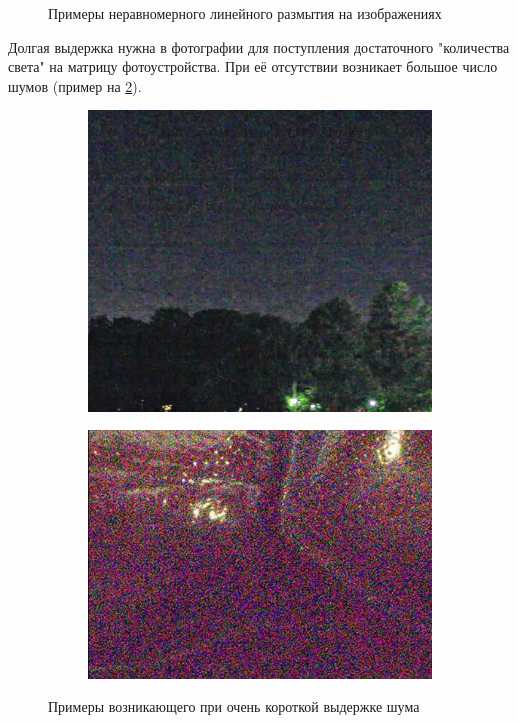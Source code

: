 \begin{figure}[h!]
\begin{subfigure}[b]{0.5\linewidth}
  \end{subfigure}
  \caption{Примеры неравномерного линейного размытия на изображениях}
  \label{fig:lblur}
\end{figure}

Долгая выдержка нужна в фотографии для поступления достаточного "количества света" на матрицу фотоустройства. При её отсутствии возникает большое число шумов (пример на \ref{fig:low_exposure}).

\begin{figure}[h!]
  \centering
  \begin{subfigure}[b]{0.4\linewidth}
    \includegraphics[width=\linewidth]{pics/linear_motion_blur/low_exposure.jpg}
  \end{subfigure}
  \begin{subfigure}[b]{0.4\linewidth}
    \includegraphics[width=\linewidth]{pics/linear_motion_blur/other_low_exp.PNG}
  \end{subfigure}
  \caption{Примеры возникающего при очень короткой выдержке шума}
  \label{fig:low_exposure}
\end{figure}

